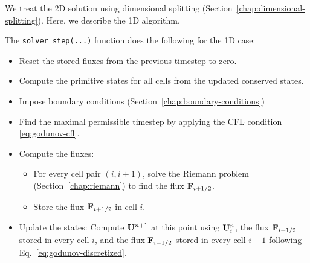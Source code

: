 
We treat the 2D solution using dimensional splitting
(Section~\ref{chap:dimensional-splitting}). Here, we describe the 1D algorithm.

The \verb|solver_step(...)| function does the following for the 1D case:

\begin{itemize}

\item Reset the stored fluxes from the previous timestep to zero.

\item Compute the primitive states for all cells from the updated conserved
states.

\item Impose boundary conditions (Section~\ref{chap:boundary-conditions})

\item Find the maximal permissible timestep by applying the CFL condition
\ref{eq:godunov-cfl}.

\item Compute the fluxes:

\begin{itemize}

\item For every cell pair $(i, i+1)$, solve the Riemann problem
	(Section~\ref{chap:riemann}) to find the flux $\mathbf{F}_{i+1/2}$.
\item Store the flux $\mathbf{F}_{i+1/2}$ in cell $i$.
\end{itemize}
\item Update the states: Compute $\mathbf{U}^{n+1}$ at this point using
$\mathbf{U}_i^n$, the flux $\mathbf{F}_{i+1/2}$ stored in every cell $i$, and the flux
$\mathbf{F}_{i-1/2}$ stored in every cell $i-1$ following
Eq.~\ref{eq:godunov-discretized}.
\end{itemize}




